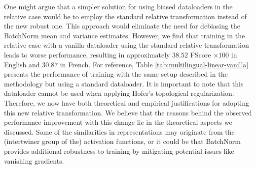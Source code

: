 \documentclass[../main.tex]{subfiles}
\begin{document}
\begin{table}[ht!]
\centering
{}
\caption{Linear vanilla dataloader (over two random seeds)}
\label{tab:multilingual-linear-vanilla}
\end{table}

One might argue that a simpler solution for using biased dataloaders in the relative case would be to employ the standard relative transformation instead of the new robust one. This approach would eliminate the need for debiasing the BatchNorm mean and variance estimates. However, we find that training in the relative case with a vanilla dataloader using the standard relative transformation leads to worse performance, resulting in approximately $38.52$ FScore $\times 100$ in English and $30.87$ in French. For reference, Table \ref{tab:multilingual-linear-vanilla} presents the performance of training with the same setup described in the methodology but using a standard dataloader. It is important to note that this dataloader cannot be used when applying Hofer's topological regularization.\\

Therefore, we now have both theoretical and empirical justifications for adopting this new relative transformation. We believe that the reasons behind the observed performance improvement with this change lie in the theoretical aspects we discussed. Some of the similarities in representations may originate from the (intertwiner group of the) activation functions, or it could be that BatchNorm provides additional robustness to training by mitigating potential issues like vanishing gradients.
\end{document}
